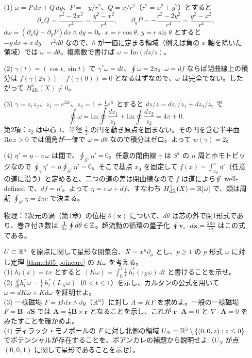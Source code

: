 \begin{solution}
(1) $\omega=P\,dx+Q\,dy$、$P=-y/r^2$、$Q=x/r^2$（$r^2=x^2+y^2$）とすると
\[
\partial_xQ=\frac{r^2-2x^2}{r^4}=\frac{y^2-x^2}{r^4},\qquad \partial_yP=-\frac{r^2-2y^2}{r^4}=\frac{y^2-x^2}{r^4},
\]
$d\omega=(\partial_xQ-\partial_yP)dx\wedge dy=0$。$x=r\cos\theta$, $y=r\sin\theta$ とすると $-y\,dx+x\,dy=r^2d\theta$ なので、$\theta$ が一価に定まる領域（例えば負の $x$ 軸を除いた領域）では $\omega=d\theta$。複素数で書けば $\omega=\mathrm{Im}(dz/z)$。

(2) $\gamma(t)=(\cos t,\sin t)$ で $\gamma^*\omega=dt$、$\oint\omega=2\pi$。$\omega=df$ ならば閉曲線上の積分は $f(\gamma(2\pi))-f(\gamma(0))=0$ となるはずなので、$\omega$ は完全でない。したがって $H^1_{\mathrm{dR}}(X)\neq0$。

(3) $\gamma=z_1z_2$、$z_1=e^{2it}$、$z_2=1+\frac12e^{it}$ とすると $dz/z=dz_1/z_1+dz_2/z_2$ で
\[
\oint\omega=\mathrm{Im}\oint\frac{dz_1}{z_1}+\mathrm{Im}\oint\frac{dz_2}{z_2}=4\pi+0 .
\]
第2項：$z_2$ は中心 $1$、半径 $\frac12$ の円を動き原点を囲まない。その円を含む半平面 $\mathrm{Re}\,z>0$ では偏角が一価で $\omega=d\theta$ なので積分はゼロ。よって $w(\gamma)=2$。

(4) $\eta'=\eta-c\,\omega$ は閉で、$\oint_{S^1}\eta'=0$。任意の閉曲線 $\gamma$ は $S^1$ の $n$ 周とホモトピックなので $\oint_\gamma\eta'=n\oint_{S^1}\eta'=0$。そこで基点 $x_0$ を固定して $f(x)=\int_{x_0}^{x}\eta'$（任意の道に沿う）と定めると、二つの道の差は閉曲線なので $f$ は道によらず well-defined で、$df=\eta'$。よって $\eta=c\,\omega+df$、すなわち $H^1_{\mathrm{dR}}(X)=\mathbb{R}[\omega]$ で、類は周期 $\oint_{S^1}\eta=2\pi c$ で決まる。

物理：2次元の渦（第1章）の位相 $\theta(\bm x)$ について、$d\theta$ は芯の外で閉1形式であり、巻き付き数は $\frac1{2\pi}\oint d\theta\in\mathbb{Z}$。超流動の循環の量子化 $\oint\bm v_s\cdot d\bm x=\frac{2\pi n}{m}$ はこの式である。
\end{solution}

\begin{problem}[難易度 C]\label{ch05-prob-poincare}
$U\subset\mathbb{R}^n$ を原点に関して星形な開集合、$X=x^\mu\partial_\mu$ とし、$p\ge1$ の $p$ 形式 $\omega$ に対し定理 \ref{thm:ch05-poincare} の $K\omega$ を考える。\\
(1) $h_t(x)=tx$ とすると $(K\omega)=\int_0^1\frac1t\,h_t^*(\iota_X\omega)\,dt$ と書けることを示せ。\\
(2) $\frac{d}{dt}h_t^*\omega=\frac1t\,h_t^*(L_X\omega)$（$0<t\le1$）を示し、カルタンの公式を用いて $\omega=dK\omega+Kd\omega$ を証明せよ。\\
(3) 一様磁場 $F=B\,dx\wedge dy$（$\mathbb{R}^3$）に対し $A=KF$ を求めよ。一般の一様磁場 $F=\bm B\cdot d\bm S$ では $\bm A=\frac12\bm B\times\bm r$ となることを示し、これが $\bm r\cdot\bm A=0$ と $\nabla\cdot\bm A=0$ をみたすことを確かめよ。\\
(4) ディラック・モノポールの $F$ に対し北側の領域 $U_N=\mathbb{R}^3\setminus\{(0,0,z):z\le0\}$ でポテンシャルが存在することを、ポアンカレの補題から説明せよ（$U_N$ が点 $(0,0,1)$ に関して星形であることを示せ）。
\end{problem}


